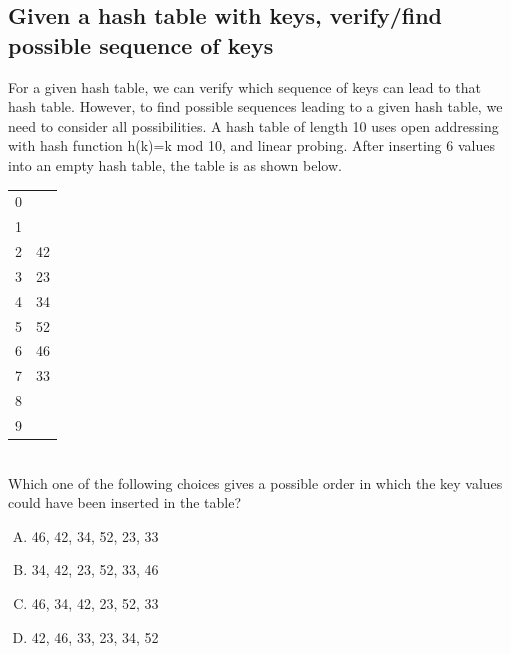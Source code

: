 \documentclass[12pt]{amsart}
\begin{document}
\subsection{Given a hash table with keys, verify/find possible sequence of keys}
For a given hash table, we can verify which sequence of keys can lead to that hash table. However, to find possible sequences leading to a given hash table, we need to consider all possibilities. A hash table of length 10 uses open addressing with hash function h(k)=k mod 10, and linear probing. After inserting 6 values into an empty hash table, the table is as shown below. 

\begin{tabular}{| l | r |}
\hline
  0 &   \\
  1 &   \\
  2 & 42  \\
  3 & 23 \\
  4 & 34 \\
  5 & 52  \\
  6 & 46  \\
  7 & 33 \\
  8 &  \\
  9 &  \\

\hline
\end{tabular}
\\

Which one of the following choices gives a possible order in which the key values could have been inserted in the table? 
\begin{enumerate}[(A)]
\item 46, 42, 34, 52, 23, 33
\item 34, 42, 23, 52, 33, 46 
\item 46, 34, 42, 23, 52, 33
\item 42, 46, 33, 23, 34, 52
\end{enumerate}
\end{document}
